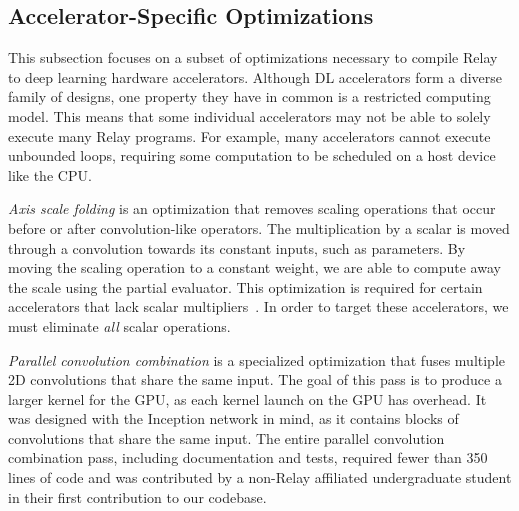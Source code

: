\subsection{Accelerator-Specific Optimizations}
\label{sec:accel-opts}


This subsection focuses on a subset of optimizations necessary to
  compile Relay to deep learning hardware accelerators.
Although DL accelerators form a diverse family of designs,
  one property they have in common is a restricted computing model.
This means that some individual accelerators
  may not be able to solely execute many Relay programs.
For example, many accelerators cannot execute unbounded loops,
  requiring some computation to be scheduled on a host device
  like the CPU.

\textit{Axis scale folding} is an optimization that removes scaling
  operations that occur before or after convolution-like operators.
The multiplication by a scalar is moved through a convolution towards
  its constant inputs, such as parameters.
By moving the scaling operation to a constant weight, we are able
  to compute away the scale using the partial evaluator.
This optimization is required for certain accelerators that lack scalar multipliers~\citep{moreau2018vta}.
In order to target these accelerators,
  we must eliminate \textit{all} scalar operations.

\textit{Parallel convolution combination} is a specialized
  optimization that fuses multiple 2D convolutions that share the same input.
The goal of this pass is to produce a larger kernel for the GPU,
  as each kernel launch on the GPU has overhead.
It was designed with the Inception network \citep{inception} in mind, as it
  contains blocks of convolutions that share the same input.
The entire parallel convolution combination pass,
  including documentation and tests,
  required fewer than 350 lines of code and was contributed
  by a non-Relay affiliated undergraduate student
  in their first contribution to our codebase.
